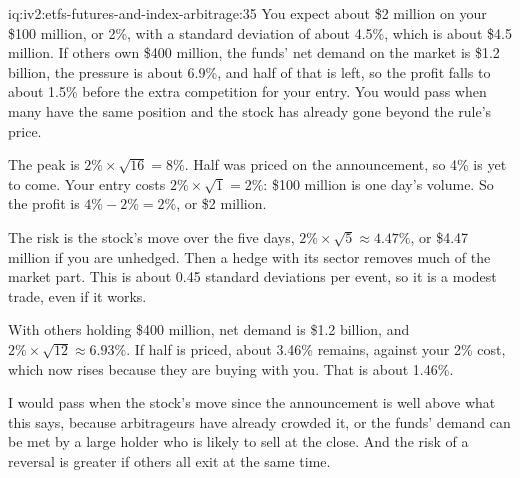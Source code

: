 \begin{solution}{iq:iv2:etfs-futures-and-index-arbitrage:35}
You expect about \$2 million on your \$100 million, or 2\%, with a standard deviation of about 4.5\%, which is about \$4.5 million. If others own \$400 million, the funds' net demand on the market is \$1.2 billion, the pressure is about 6.9\%, and half of that is left, so the profit falls to about 1.5\% before the extra competition for your entry. You would pass when many have the same position and the stock has already gone beyond the rule's price.

The peak is $2\% \times \sqrt{16} = 8\%$. Half was priced on the announcement, so 4\% is yet to come. Your entry costs $2\% \times \sqrt{1} = 2\%$: \$100 million is one day's volume. So the profit is $4\% - 2\% = 2\%$, or \$2 million.

The risk is the stock's move over the five days, $2\% \times \sqrt 5 \approx 4.47\%$, or \$4.47 million if you are unhedged. Then a hedge with its sector removes much of the market part. This is about 0.45 standard deviations per event, so it is a modest trade, even if it works.

With others holding \$400 million, net demand is \$1.2 billion, and $2\% \times \sqrt{12} \approx 6.93\%$. If half is priced, about 3.46\% remains, against your 2\% cost, which now rises because they are buying with you. That is about 1.46\%.

I would pass when the stock's move since the announcement is well above what this says, because arbitrageurs have already crowded it, or the funds' demand can be met by a large holder who is likely to sell at the close. And the risk of a reversal is greater if others all exit at the same time.

\end{solution}
